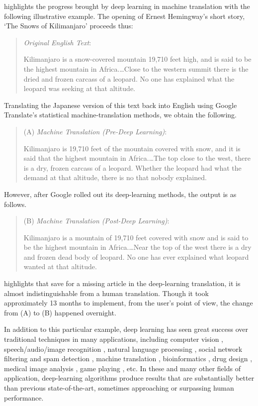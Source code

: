 \documentclass{amsart}
\theoremstyle{indented}
\theoremstyle{indentedProp}
\theoremstyle{indented}
\theoremstyle{indented}
\theoremstyle{indented}
\theoremstyle{indented}
\theoremstyle{indented}
\begin{document}
\citet{Lewis-Kraus-2016} highlights the progress brought by deep learning in machine translation with the following illustrative example. The opening of Ernest Hemingway's short story, `The Snows of Kilimanjaro' proceeds thus:
\begin{quote}
{\it Original English Text}:

    \noindent Kilimanjaro is a snow-covered mountain 19,710 feet high, and is said to be the highest mountain in Africa.\ldots Close to the western summit there is the dried and frozen carcass of a leopard. No one has explained what the leopard was seeking at that altitude.
\end{quote}
Translating the Japanese version of this text back into English using Google Translate's statistical machine-translation methods, we obtain the following.
\begin{quote}
(A) {\it Machine Translation (Pre-Deep Learning)}:

    \noindent Kilimanjaro is 19,710 feet of the mountain covered with snow, and it is said that the highest mountain in Africa.\ldots The top close to the west, there is a dry, frozen carcass of a leopard. Whether the leopard had what the demand at that altitude, there is no that nobody explained.
\end{quote}
However, after Google rolled out its deep-learning methods, the output is as follows.
\begin{quote}
(B) {\it Machine Translation (Post-Deep Learning)}:

    \noindent Kilimanjaro is a mountain of 19,710 feet covered with snow and is said to be the highest mountain in Africa.\ldots Near the top of the west there is a dry and frozen dead body of leopard. No one has ever explained what leopard wanted at that altitude.
\end{quote}
\citet{Lewis-Kraus-2016} highlights that save for a missing article in the deep-learning translation, it is almost indistinguishable from a human translation. Though it took approximately 13 months to implement, from the user's point of view, the change from (A) to (B) happened overnight.

In addition to this particular example, deep learning has seen great success over traditional techniques in many applications, including computer vision \citep{OMahony-et-al-2019}, speech/audio/image recognition \citep{Lee-et-al-2009, Ngiam-et-al-2011, Mroueh-et-al-2015, Wu-et-al-2015, Amodei-et-al-2016, Prasad-et-al-2020}, natural language processing \citep{Collobert-Weston-2008, Young-et-al-2018}, social network filtering \citep{Xie-et-al-2018} and spam detection \citep{Zheng-et-al-2015, Wu-et-al-2017, Barushka-Hajek-2018}, machine translation \citep{Wu-et-al-2016, Vaswani-et-al-2018}, bioinformatics \citep{Chen-et-al-2016, Min-et-al-2017, Li-et-al-2019}, drug design \citep{Gawehn-et-al-2016, Jing-et-al-2018}, medical image analysis \citep{Litjens-et-al-2017, Shen-et-al-2017}, game playing \citep{Mnih-et-al-2013, Mnih-et-al-2015, Silver-et-al-2016, Silver-et-al-2017, Silver-et-al-2018}, etc. In these and many other fields of application, deep-learning algorithms produce results that are substantially better than previous state-of-the-art, sometimes approaching or surpassing human performance.
\end{document}
